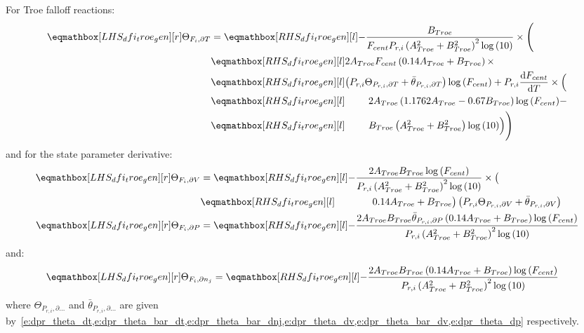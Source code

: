 \documentclass[12pt,number,sort&compress]{elsarticle}
\begin{document}
For Troe falloff reactions:
\begin{align}
\label{e:dfi_troe_dt_prod}
\lhs{dfi_troe_gen}{\Theta_{F_i, \partial T}} &=
\rhs{dfi_troe_gen}{ - \frac{B_{Troe}}{F_{cent} P_{r, i} \left(A_{Troe}^{2} + B_{Troe}^{2}\right)^{2} \log{\left (10 \right )}} \times \Biggl(} \nonumber \\
&\rhs{dfi_troe_gen}{ 2 A_{Troe} F_{cent} \left(0.14 A_{Troe} + B_{Troe}\right) \times } \nonumber \\
&\rhs{dfi_troe_gen}{\left( P_{r, i} \Theta_{P_{r,i}, \partial T} + \bar{\theta}_{P_{r, i}, \partial T}\right) \log{\left (F_{cent} \right )} + P_{r, i} \frac{\text{d} F_{cent} }{\text{d} T } \times \Bigl(} \nonumber \\
&\rhs{dfi_troe_gen}{\mathindent 2 A_{Troe} \left(1.1762 A_{Troe} - 0.67 B_{Troe}\right) \log{\left (F_{cent} \right )} - } \nonumber \\
&\rhs{dfi_troe_gen}{\mathindent B_{Troe} \left(A_{Troe}^{2} + B_{Troe}^{2}\right) \log{\left (10 \right )}\Bigr)\Biggr)}
\end{align}
and for the state parameter derivative:
\begin{subequations}
 \label{e:dfi_troe_de_prod}
 \begin{align}
   \lhs{dfi_troe_gen}{\Theta_{F_i, \partial V}} &= \rhs{dfi_troe_gen}{- \frac{2 A_{Troe} B_{Troe} \log{\left (F_{cent} \right )}}{P_{r, i} \left(A_{Troe}^{2} + B_{Troe}^{2}\right)^{2} \log{\left (10 \right )}} \times \bigl(} \nonumber \\
					    & \rhs{dfi_troe_gen}{\mathindent[alittlebit] 0.14 A_{Troe} + B_{Troe}\bigr) \left(P_{r, i} \Theta_{P_{r,i}, \partial V} + \bar{\theta}_{P_{r, i}, \partial V}\right)} \\
   \lhs{dfi_troe_gen}{\Theta_{F_i, \partial P}} &= \rhs{dfi_troe_gen}{- \frac{2 A_{Troe} B_{Troe} \bar{\theta}_{P_{r, i}, \partial P} \left(0.14 A_{Troe} + B_{Troe}\right) \log{\left (F_{cent} \right )}}{P_{r, i} \left(A_{Troe}^{2} + B_{Troe}^{2}\right)^{2} \log{\left (10 \right )}}}
 \end{align}
\end{subequations}
and:
\begin{align}
 \label{e:dfi_troe_dnj_prod}
\lhs{dfi_troe_gen}{\Theta_{F_i, \partial n_j}} &= \rhs{dfi_troe_gen}{- \frac{2 A_{Troe} B_{Troe} \left(0.14 A_{Troe} + B_{Troe}\right) \log{\left (F_{cent} \right )}}{P_{r, i} \left(A_{Troe}^{2} + B_{Troe}^{2}\right)^{2} \log{\left (10 \right )}}}
\end{align}
where $\Theta_{P_{r,i}, \partial \ldots}$ and $\bar{\theta}_{P_{r, i}, \partial \ldots}$ are given by~\cref{e:dpr_theta_dt,e:dpr_theta_bar_dt,e:dpr_theta_bar_dnj,e:dpr_theta_dv,e:dpr_theta_bar_dv,e:dpr_theta_dp} respectively.
\end{document}
